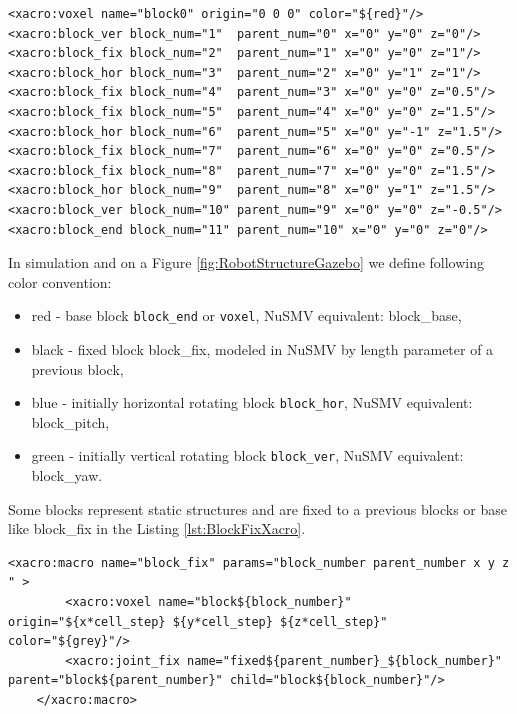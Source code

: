 \begin{lstlisting}[language=xacro, caption={Robot configuration as a sequence of blocks}, label={lst:RobotXacroStructure}]
<xacro:voxel name="block0" origin="0 0 0" color="${red}"/>
<xacro:block_ver block_num="1"  parent_num="0" x="0" y="0" z="0"/>
<xacro:block_fix block_num="2"  parent_num="1" x="0" y="0" z="1"/>
<xacro:block_hor block_num="3"  parent_num="2" x="0" y="1" z="1"/>
<xacro:block_fix block_num="4"  parent_num="3" x="0" y="0" z="0.5"/>
<xacro:block_fix block_num="5"  parent_num="4" x="0" y="0" z="1.5"/>
<xacro:block_hor block_num="6"  parent_num="5" x="0" y="-1" z="1.5"/>
<xacro:block_fix block_num="7"  parent_num="6" x="0" y="0" z="0.5"/>
<xacro:block_fix block_num="8"  parent_num="7" x="0" y="0" z="1.5"/>
<xacro:block_hor block_num="9"  parent_num="8" x="0" y="1" z="1.5"/>
<xacro:block_ver block_num="10" parent_num="9" x="0" y="0" z="-0.5"/>
<xacro:block_end block_num="11" parent_num="10" x="0" y="0" z="0"/>
\end{lstlisting}

In simulation and on a Figure \ref{fig:RobotStructureGazebo} we define
following color convention:
\begin{itemize}
    \item red - base block \texttt{block\_end} or \texttt{voxel}, NuSMV equivalent: block\_base,
    \item black - fixed block block\_fix,  
        modeled in NuSMV by length parameter of a previous block,
    \item blue - initially horizontal rotating block \texttt{block\_hor}, NuSMV equivalent: block\_pitch,
    \item green - initially vertical rotating block \texttt{block\_ver}, NuSMV equivalent: block\_yaw.

\end{itemize}

Some blocks represent static structures and are fixed to a previous blocks 
or base like block\_fix in the Listing \ref{lst:BlockFixXacro}.

\begin{lstlisting}[language=xacro, caption={Block type block\_fix as a macros }, label={lst:BlockFixXacro}]
    <xacro:macro name="block_fix" params="block_number parent_number x y z " >
        <xacro:voxel name="block${block_number}" origin="${x*cell_step} ${y*cell_step} ${z*cell_step}" color="${grey}"/>
        <xacro:joint_fix name="fixed${parent_number}_${block_number}" parent="block${parent_number}" child="block${block_number}"/> 
    </xacro:macro>
\end{lstlisting}


